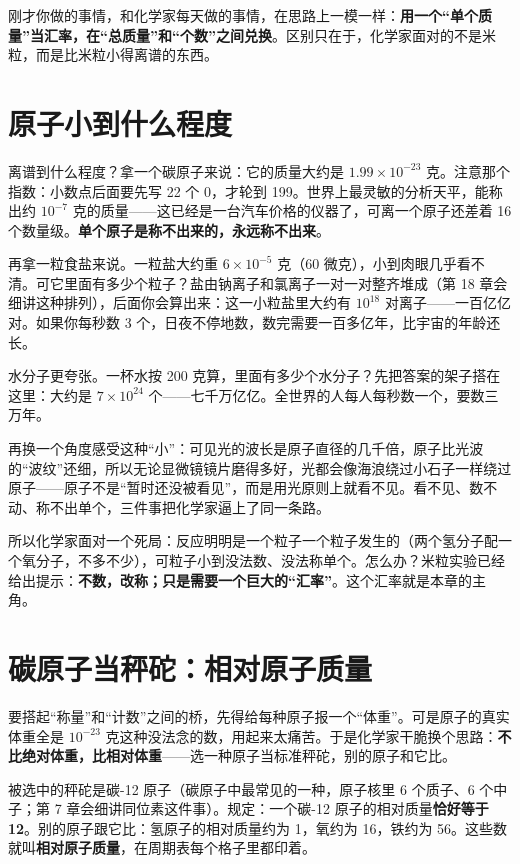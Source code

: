 刚才你做的事情，和化学家每天做的事情，在思路上一模一样：\textbf{用一个“单个质量”当汇率，在“总质量”和“个数”之间兑换}。区别只在于，化学家面对的不是米粒，而是比米粒小得离谱的东西。

\section{原子小到什么程度}

离谱到什么程度？拿一个碳原子来说：它的质量大约是 $1.99\times 10^{-23}$ 克。注意那个指数：小数点后面要先写 22 个 0，才轮到 199。世界上最灵敏的分析天平，能称出约 $10^{-7}$ 克的质量——这已经是一台汽车价格的仪器了，可离一个原子还差着 16 个数量级。\textbf{单个原子是称不出来的，永远称不出来}。

再拿一粒食盐来说。一粒盐大约重 $6\times 10^{-5}$ 克（60 微克），小到肉眼几乎看不清。可它里面有多少个粒子？盐由钠离子和氯离子一对一对整齐堆成（第 18 章会细讲这种排列），后面你会算出来：这一小粒盐里大约有 $10^{18}$ 对离子——一百亿亿对。如果你每秒数 3 个，日夜不停地数，数完需要一百多亿年，比宇宙的年龄还长。

水分子更夸张。一杯水按 200 克算，里面有多少个水分子？先把答案的架子搭在这里：大约是 $7\times 10^{24}$ 个——七千万亿亿。全世界的人每人每秒数一个，要数三万年。

再换一个角度感受这种“小”：可见光的波长是原子直径的几千倍，原子比光波的“波纹”还细，所以无论显微镜镜片磨得多好，光都会像海浪绕过小石子一样绕过原子——原子不是“暂时还没被看见”，而是用光原则上就看不见。看不见、数不动、称不出单个，三件事把化学家逼上了同一条路。

所以化学家面对一个死局：反应明明是一个粒子一个粒子发生的（两个氢分子配一个氧分子，不多不少），可粒子小到没法数、没法称单个。怎么办？米粒实验已经给出提示：\textbf{不数，改称；只是需要一个巨大的“汇率”}。这个汇率就是本章的主角。

\section{碳原子当秤砣：相对原子质量}

要搭起“称量”和“计数”之间的桥，先得给每种原子报一个“体重”。可是原子的真实体重全是 $10^{-23}$ 克这种没法念的数，用起来太痛苦。于是化学家干脆换个思路：\textbf{不比绝对体重，比相对体重}——选一种原子当标准秤砣，别的原子和它比。

被选中的秤砣是碳-12 原子（碳原子中最常见的一种，原子核里 6 个质子、6 个中子；第 7 章会细讲同位素这件事）。规定：一个碳-12 原子的相对质量\textbf{恰好等于 12}。别的原子跟它比：氢原子的相对质量约为 1，氧约为 16，铁约为 56。这些数就叫\textbf{相对原子质量}，在周期表每个格子里都印着。

